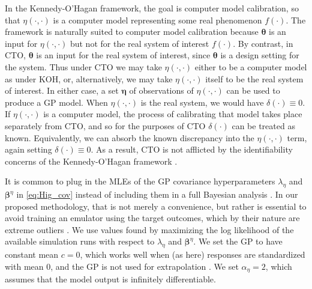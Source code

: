 \documentclass[12pt]{article}
\begin{document}
%
In the Kennedy-O'Hagan framework, the goal is computer model calibration, so that $\eta(\cdot,\cdot)$ is a computer model representing some real phenomenon $f(\cdot)$. 
%
The framework is naturally suited to computer model calibration because $\boldsymbol\theta$ is an input for $\eta(\cdot,\cdot)$ but not for the real system of interest $f(\cdot)$.
%
By contrast, in CTO, $\boldsymbol\theta$ is an input for the real system of interest, since $\boldsymbol\theta$ is a design setting for the system.
%
Thus under CTO we may take $\eta(\cdot,\cdot)$ either to be a computer model as under KOH, or, alternatively, we may take $\eta(\cdot,\cdot)$ itself to be the real system of interest.
%
In either case, a set $\boldsymbol\eta$ of observations of $\eta(\cdot,\cdot)$ can be used to produce a GP model.
%
When $\eta(\cdot,\cdot)$ is the real system, we would have $\delta(\cdot)\equiv0$.
%
If $\eta(\cdot,\cdot)$ is a computer model, the process of calibrating that model takes place separately from CTO, and so for the purposes of CTO $\delta(\cdot)$ can be treated as known.
%
Equivalently, we can absorb the known discrepancy into the $\eta(\cdot,\cdot)$ term, again setting $\delta(\cdot)\equiv0$.
%
As a result, CTO is not afflicted by the identifiability concerns of the Kennedy-O'Hagan framework \citep{Bayarri2007,Tuo2016}.
%

%
It is common to plug in the MLEs of the GP covariance hyperparameters $\lambda_\eta$ and $\boldsymbol \beta^\eta$ in \eqref{eq:Hig_cov} instead of including them in a full Bayesian analysis \citep{Kennedy2001,Santner2003a,Qian2008,Paulo2012}.
%
In our proposed methodology, that is not merely a convenience, but rather is essential 
%
%
%
%
to avoid training an emulator using the target outcomes, which by their nature are extreme outliers  \citep[see][on the dangers that arise here]{Liu2009}.
%
We use values found by maximizing the log likelihood of the available simulation runs with respect to $\lambda_\eta$ and $\boldsymbol\beta^\eta$.
%
We set the GP to have constant mean $c=0$, which works well when (as here) responses are standardized with mean 0, and the GP is not used for extrapolation \citep{Bayarri2007}.
%
We set $\alpha_\eta = 2$, which assumes that the model output is infinitely differentiable.
%
\end{document}
